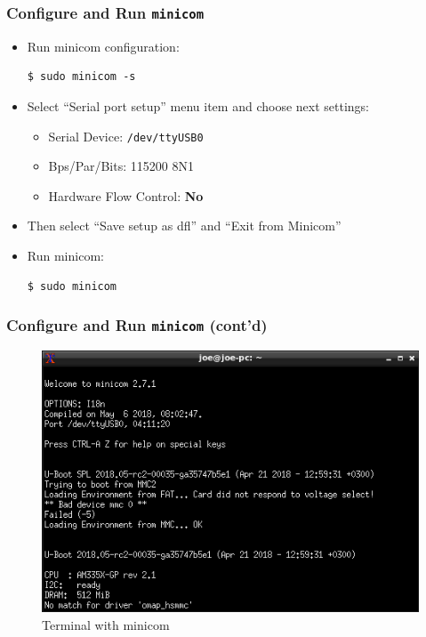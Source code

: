 \documentclass[aspectratio=169]{beamer}
\begin{document}
\begin{frame}[fragile]
  \frametitle{Configure and Run \texttt{minicom}}
  \begin{itemize}
    \item Run minicom configuration:
    \begin{verbatim}
$ sudo minicom -s
    \end{verbatim}
    \item Select ``Serial port setup'' menu item and choose next settings:
      \begin{itemize}
        \item Serial Device: \texttt{/dev/ttyUSB0}
        \item Bps/Par/Bits: 115200 8N1
	\item Hardware Flow Control: \alert{\textbf{No}}
      \end{itemize}
    \item Then select ``Save setup as dfl'' and ``Exit from Minicom''
    \item Run minicom:
    \begin{verbatim}
$ sudo minicom
    \end{verbatim}
  \end{itemize}
\end{frame}

\begin{frame}
  \frametitle{Configure and Run \texttt{minicom} (cont'd)}
  \begin{figure}
    \centering
    \includegraphics[scale=0.6]{images/minicom.png}
    \caption{Terminal with minicom}
  \end{figure}
  \vspace*{-5mm} %
\end{frame}
\end{document}

